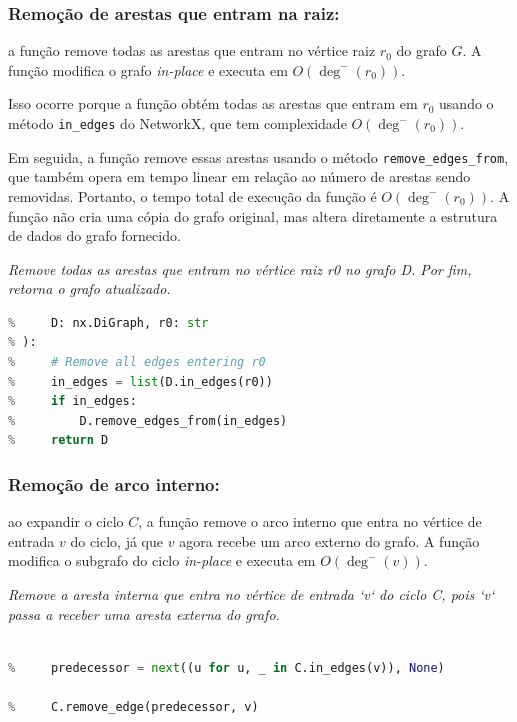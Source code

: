 \subsubsection{Remoção de arestas que entram na raiz:}
a função remove todas as arestas que entram no vértice raiz \(r_0\) do grafo \(G\). A função modifica o grafo \emph{in-place} e executa em \(O(\deg^-(r_0))\).


Isso ocorre porque a função obtém todas as arestas que entram em \(r_0\) usando o método \texttt{in\_edges} do NetworkX, que tem complexidade \(O(\deg^-(r_0))\).


Em seguida, a função remove essas arestas usando o método \texttt{remove\_edges\_from}, que também opera em tempo linear em relação ao número de arestas sendo removidas. Portanto, o tempo total de execução da função é \(O(\deg^-(r_0))\). A função não cria uma cópia do grafo original, mas altera diretamente a estrutura de dados do grafo fornecido.


\begin{tcolorbox}[
  enhanced, breakable,
  colframe=blue!60!black, colback=blue!2,
  colbacktitle=blue!15, coltitle=black,
  title={Remoção de arestas que entram na raiz},
  boxed title style={sharp corners, boxrule=0.6pt},
  sharp corners, boxrule=0.6pt
]
\emph{Remove todas as arestas que entram no vértice raiz r0 no grafo D. Por fim, retorna o grafo atualizado.}
\tcblower
\begin{lstlisting}[mathescape=true, language=Python]
% def remove_edges_to_r0(
%     D: nx.DiGraph, r0: str
% ):
%     # Remove all edges entering r0
%     in_edges = list(D.in_edges(r0))
%     if in_edges:
%         D.remove_edges_from(in_edges)
%     return D
\end{lstlisting}
\end{tcolorbox}


\subsubsection{Remoção de arco interno:}
ao expandir o ciclo \(C\), a função remove o arco interno que entra no vértice de entrada \(v\) do ciclo, já que \(v\) agora recebe um arco externo do grafo. A função modifica o subgrafo do ciclo \emph{in-place} e executa em \(O(\deg^-(v))\).

\begin{tcolorbox}[
        enhanced, breakable,
        colframe=blue!60!black, colback=blue!2,
        colbacktitle=blue!15, coltitle=black,
        title={Remover arco interno na reexpansão},
        boxed title style={sharp corners, boxrule=0.6pt},
        sharp corners, boxrule=0.6pt
    ]
    \emph{Remove a aresta interna que entra no vértice de entrada `v` do ciclo C, pois `v` passa a receber uma aresta externa do grafo.}
    \tcblower
    \begin{lstlisting}[mathescape=true, language=Python]
% def remove_internal_edge_to_cycle_entry(C: nx.DiGraph, v):

%     predecessor = next((u for u, _ in C.in_edges(v)), None)

%     C.remove_edge(predecessor, v) 
\end{lstlisting}
\end{tcolorbox}



